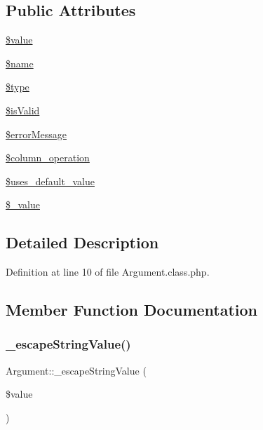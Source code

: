 \subsection*{Public Attributes}
\begin{DoxyCompactItemize}
\item 
\hyperlink{classArgument_a762eb8881d615f61189bba09b9bd7300}{\$value}
\item 
\hyperlink{classArgument_ab37a45cb92464255505b2f4f35909da6}{\$name}
\item 
\hyperlink{classArgument_a7a2272bc3d12787f80143fbea01698f4}{\$type}
\item 
\hyperlink{classArgument_af1a5d4055fd3e16bea7951843a3bdd92}{\$is\+Valid}
\item 
\hyperlink{classArgument_ad0af83b11507626a9c95fd188e60b592}{\$error\+Message}
\item 
\hyperlink{classArgument_a366cb3ac7d44ed1037c96ca2bfad6be4}{\$column\+\_\+operation}
\item 
\hyperlink{classArgument_a3f8f20477043da002ba9d48ede482baf}{\$uses\+\_\+default\+\_\+value}
\item 
\hyperlink{classArgument_aba96b050a81b62ccf10a78638d208353}{\$\+\_\+value}
\end{DoxyCompactItemize}


\subsection{Detailed Description}


Definition at line 10 of file Argument.\+class.\+php.



\subsection{Member Function Documentation}
\mbox{\label{classArgument_afd7b071db98f0a4c8ef60cdd8db8a3b2}} 
\subsubsection{\texorpdfstring{\+\_\+escape\+String\+Value()}{\_escapeStringValue()}}
{\footnotesize\ttfamily Argument\+::\+\_\+escape\+String\+Value (\begin{DoxyParamCaption}\item[{}]{\$value }\end{DoxyParamCaption})}

